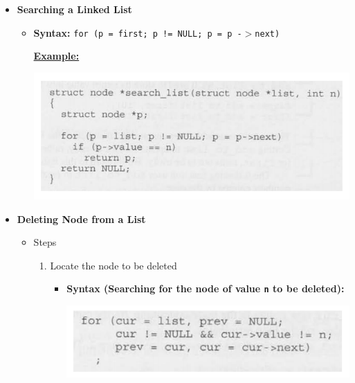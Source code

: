 \documentclass[12pt]{article}
\begin{document}
\begin{enumerate}[1.]
    \begin{itemize}
        \item \textbf{Searching a Linked List}

        \begin{itemize}
            \item \textbf{Syntax:} \texttt{for (p = first; p != NULL; p = p -$>$next)}

            \bigskip

            \underline{\textbf{Example:}}

            \bigskip

            \begin{center}
            \includegraphics[width=0.9\linewidth]{images/review_8_solution_3.png}
            \end{center}
        \end{itemize}
        \item \textbf{Deleting Node from a List}

        \begin{itemize}
            \item Steps

            \begin{enumerate}[1.]
                \item Locate the node to be deleted

                \begin{itemize}
                    \item \textbf{Syntax (Searching for the node of value \texttt{n} to be deleted):}

                    \bigskip

                    \begin{center}
                    \includegraphics[width=0.8\linewidth]{images/review_8_solution_4.png}
                    \end{center}
                \end{itemize}


\end{enumerate}
\end{itemize}
\end{itemize}
\end{enumerate}
\end{document}
